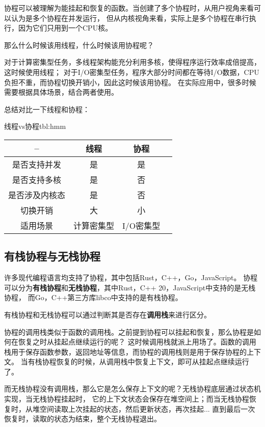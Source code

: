 \documentclass[supercite]{HustGraduPaper}
\theoremstyle{definition}
\begin{document}
协程可以被理解为能挂起和恢复的函数。当创建了多个协程时，从用户视角来看可以认为是多个协程在并发运行，
但从内核视角来看，实际上是多个协程在串行执行，因为它们只用到一个CPU核。\par

那么什么时候该用线程，什么时候该用协程呢？\par

对于计算密集型任务，多线程架构能充分利用多核，使得程序运行效率成倍提高，这时候使用线程；
对于I/O密集型任务，程序大部分时间都在等待I/O数据，CPU负担不重，而协程切换开销小，因此这时候该用协程。
在实际应用中，很多时候需要根据具体场景，结合两者使用。\par

总结对比一下线程和协程：

\begin{generaltab}{线程vs协程}{tbl:hmm}
  \begin{tabular}{c|ccc}
    \toprule
    -- & 线程 & 协程 \\
    \midrule
    是否支持并发 & 是 & 是 \\
    是否支持多核 & 是 & 否 \\
    是否涉及内核态 & 是 & 否 \\
    切换开销 & 大 & 小 \\
    适用场景 & 计算密集型 & I/O密集型 \\
    \bottomrule
  \end{tabular}
\end{generaltab}

\subsection{有栈协程与无栈协程}
许多现代编程语言均支持了协程，其中包括Rust，C++，Go，JavaScript。
协程可以分为\textbf{有栈协程}和\textbf{无栈协程}，其中Rust，C++ 20，JavaScript中支持的是无栈协程，
而Go，C++第三方库libco中支持的是有栈协程。\par

有栈协程和无栈协程可以通过判断其是否存在\textbf{调用栈}来进行区分。\par

协程的调用栈类似于函数的调用栈。之前提到协程可以挂起和恢复，那么协程是如何在恢复之时从挂起点继续运行的呢？
这时候调用栈就派上用场了。函数的调用栈用于保存函数参数，返回地址等信息，而协程的调用栈则是用于保存协程的上下文。
当有栈协程恢复的时候，从调用栈中恢复上下文，即可从挂起点继续运行了。\par

而无栈协程没有调用栈，那么它是怎么保存上下文的呢？无栈协程底层通过状态机实现，当无栈协程挂起时，
它的上下文状态会保存在堆空间上；而当无栈协程恢复时，从堆空间读取上次挂起的状态，然后更新状态，再次挂起...
直到最后一次恢复时，读取的状态为结束，整个无栈协程退出。\par
\end{document}
